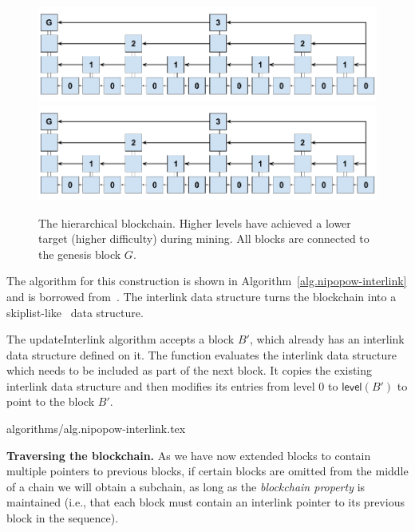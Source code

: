\begin{figure}
    \caption{The hierarchical blockchain.
    Higher levels have achieved a lower target (higher difficulty) during
    mining. All blocks are connected to the genesis block $G$.}
    \centering
    \iftwocolumn
        \includegraphics[width=0.9\columnwidth,keepaspectratio]{figures/hierarchical-ledger.png}
    \else
        \includegraphics[width=0.7\columnwidth,keepaspectratio]{figures/hierarchical-ledger.png}
    \fi
    \label{fig.hierarchy}
\end{figure}

The algorithm for this construction is shown in
Algorithm~\ref{alg.nipopow-interlink} and is borrowed from~\cite{KLS}. The
interlink data structure turns the blockchain into a
skiplist-like~\cite{skiplist} data structure.

The updateInterlink algorithm accepts a block $B'$, which already has an
interlink data structure defined on it. The function evaluates the
interlink data structure which needs to be included as part of the next block.
It copies the existing interlink data structure and
then modifies its entries from level $0$ to $\textsf{level}(B')$ to
point to the block $B'$.

{algorithms/alg.nipopow-interlink.tex}

\noindent\textbf{Traversing the blockchain. }
As we have now extended blocks to contain multiple pointers to previous blocks,
if certain blocks are omitted from the middle of a chain we will obtain a
subchain, as long as the \emph{blockchain property} is maintained (i.e., that
each block must contain an interlink pointer to its previous block in the
sequence).

